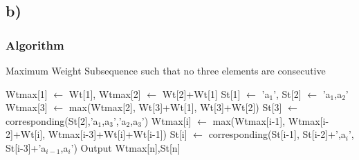 \documentclass{report}
\begin{document}
 \subsection*{b)}
 \subsubsection*{Algorithm}
 \begin{algorithm}[H]
    \caption{Maximum Weight Subsequence such that no three elements are consecutive}
    \begin{algorithmic}[1]
    \STATE Wtmax[1] $\gets$ Wt[1], Wtmax[2] $\gets$ Wt[2]+Wt[1] 
    \STATE St[1] $\gets$ 'a$_1$', St[2] $\gets$ 'a$_1$,a$_2$'
    \STATE Wtmax[3] $\gets$ max(Wtmax[2], Wt[3]+Wt[1], Wt[3]+Wt[2])
    \STATE St[3] $\gets$ corresponding(St[2],'a$_1$,a$_3$','a$_2$,a$_3$')
    \STATE Wtmax[i] $\gets$ max(Wtmax[i-1], Wtmax[i-2]+Wt[i], Wtmax[i-3]+Wt[i]+Wt[i-1])
    \STATE St[i] $\gets$ corresponding(St[i-1], St[i-2]+',a$_i$', St[i-3]+'a$_{i-1}$,a$_i$')
    \ENDFOR
    \STATE Output Wtmax[n],St[n]
    \end{algorithmic}
\end{algorithm}
\end{document}
